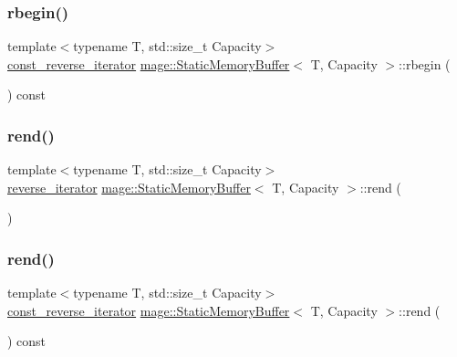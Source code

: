 \subsubsection{\texorpdfstring{rbegin()}{rbegin()}\hspace{0.1cm}{\footnotesize\ttfamily [2/2]}}
{\footnotesize\ttfamily template$<$typename T, std\+::size\+\_\+t Capacity$>$ \\
\mbox{\hyperlink{classmage_1_1_static_memory_buffer_afcde56a284e78597f2b331fc9bf379e8}{const\+\_\+reverse\+\_\+iterator}} \mbox{\hyperlink{classmage_1_1_static_memory_buffer}{mage\+::\+Static\+Memory\+Buffer}}$<$ T, Capacity $>$\+::rbegin (\begin{DoxyParamCaption}{ }\end{DoxyParamCaption}) const\hspace{0.3cm}{\ttfamily [noexcept]}}

\mbox{\label{classmage_1_1_static_memory_buffer_aeafc09b68edeb0bc2e955814d4d1089f}} 
\subsubsection{\texorpdfstring{rend()}{rend()}\hspace{0.1cm}{\footnotesize\ttfamily [1/2]}}
{\footnotesize\ttfamily template$<$typename T, std\+::size\+\_\+t Capacity$>$ \\
\mbox{\hyperlink{classmage_1_1_static_memory_buffer_a2ea67615d569f1eecb101f4fbe3eb6a7}{reverse\+\_\+iterator}} \mbox{\hyperlink{classmage_1_1_static_memory_buffer}{mage\+::\+Static\+Memory\+Buffer}}$<$ T, Capacity $>$\+::rend (\begin{DoxyParamCaption}{ }\end{DoxyParamCaption})\hspace{0.3cm}{\ttfamily [noexcept]}}

\mbox{\label{classmage_1_1_static_memory_buffer_a1f838011ed2134e286e4264e4e348e4b}} 
\subsubsection{\texorpdfstring{rend()}{rend()}\hspace{0.1cm}{\footnotesize\ttfamily [2/2]}}
{\footnotesize\ttfamily template$<$typename T, std\+::size\+\_\+t Capacity$>$ \\
\mbox{\hyperlink{classmage_1_1_static_memory_buffer_afcde56a284e78597f2b331fc9bf379e8}{const\+\_\+reverse\+\_\+iterator}} \mbox{\hyperlink{classmage_1_1_static_memory_buffer}{mage\+::\+Static\+Memory\+Buffer}}$<$ T, Capacity $>$\+::rend (\begin{DoxyParamCaption}{ }\end{DoxyParamCaption}) const\hspace{0.3cm}{\ttfamily [noexcept]}}

